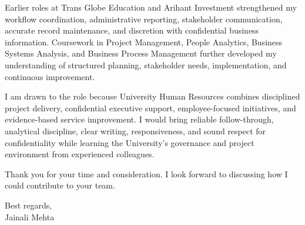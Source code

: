 \documentclass[letterpaper,10pt]{article}
\begin{document}
Earlier roles at Trans Globe Education and Arihant Investment strengthened my workflow coordination, administrative reporting, stakeholder communication, accurate record maintenance, and discretion with confidential business information. Coursework in Project Management, People Analytics, Business Systems Analysis, and Business Process Management further developed my understanding of structured planning, stakeholder needs, implementation, and continuous improvement.

I am drawn to the role because University Human Resources combines disciplined project delivery, confidential executive support, employee-focused initiatives, and evidence-based service improvement. I would bring reliable follow-through, analytical discipline, clear writing, responsiveness, and sound respect for confidentiality while learning the University's governance and project environment from experienced colleagues.

Thank you for your time and consideration. I look forward to discussing how I could contribute to your team.

Best regards,\\[8pt]
Jainali Mehta
\end{document}
